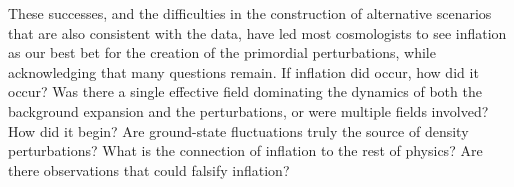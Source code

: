 
These successes, and the difficulties in the construction of alternative
scenarios that are also consistent with the data, have led most cosmologists to
see inflation as our best bet for the creation of the primordial perturbations,
while acknowledging that many questions remain. If inflation did occur, how did
it occur? Was there a single effective field dominating the dynamics of both
the background expansion and the perturbations, or were multiple fields
involved? How did it begin? Are ground-state fluctuations truly the source of density
perturbations? What is the connection of inflation to the rest of physics?
Are there observations that could falsify inflation?


